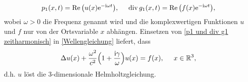\begin{equation}
	\label{p1 und div g1 zeitharmonisch}
	p_1(x,t)=\operatorname{Re}\big(u(x)\mathrm{e}^{-\mathrm{i}\omega t}\big),\;\;\;\;\;\operatorname{div} g_1(x,t)=\operatorname{Re}\big(f(x)\mathrm{e}^{-\mathrm{i}\omega t}\big),
\end{equation}
wobei \(\omega>0\) die Frequenz genannt wird und die komplexwertigen Funktionen \(u\) und \(f\) nur von der Ortsvariable \(x\) abhängen. Einsetzen von \eqref{p1 und div g1 zeitharmonisch} in \eqref{Wellengleichung} liefert, dass
\begin{equation}
	\label{einsetzen von (p1 und div g1 zeitharmonisch) in (Wellengleichung)}
	\Delta u(x)+\frac{\omega^2}{c^2}\Big(1+\frac{\mathrm{i}\gamma}{\omega}\Big)u(x)=f(x),\;\;\;\;\;x\in\mathbb{R}^3,
\end{equation}
d.h. \(u\) löst die 3-dimensionale Helmholtzgleichung. 

